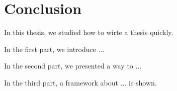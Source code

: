 \chapter{Conclusion}
\label{conclusion}

In this thesis,
we studied how to wirte a thesis quickly.

In the first part,
we introduce ...

In the second part,
we presented a way to ...

In the third part,
a framework about ... is shown.
